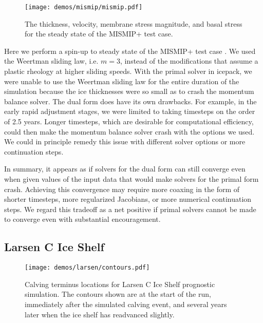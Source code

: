 \documentclass{article}
\theoremstyle{definition}
\theoremstyle{plain}
\begin{document}
\begin{figure}[t]
    \begin{center}
        \texttt{[image: demos/mismip/mismip.pdf]}
    \end{center}
    \caption{The thickness, velocity, membrane stress magnitude, and basal stress for the steady state of the MISMIP+ test case.}
    \label{fig:mismip}
\end{figure}

Here we perform a spin-up to steady state of the MISMIP+ test case \citep{asay2016experimental}.
We used the Weertman sliding law, i.e. $m = 3$, instead of the modifications that assume a plastic rheology at higher sliding speeds.
With the primal solver in icepack, we were unable to use the Weertman sliding law for the entire duration of the simulation because the ice thicknesses were so small as to crash the momentum balance solver.
The dual form does have its own drawbacks.
For example, in the early rapid adjustment stages, we were limited to taking timesteps on the order of 2.5 years.
Longer timesteps, which are desirable for computational efficiency, could then make the momentum balance solver crash with the options we used.
We could in principle remedy this issue with different solver options or more continuation steps.

In summary, it appears as if solvers for the dual form can still converge even when given values of the input data that would make solvers for the primal form crash.
Achieving this convergence may require more coaxing in the form of shorter timesteps, more regularized Jacobians, or more numerical continuation steps.
We regard this tradeoff as a net positive if primal solvers cannot be made to converge even with substantial encouragement.

\subsection{Larsen C Ice Shelf}

\begin{figure}[t]
    \begin{center}
        \texttt{[image: demos/larsen/contours.pdf]}
    \end{center}
    \caption{Calving terminus locations for Larsen C Ice Shelf prognostic simulation.
    The contours shown are at the start of the run, immediately after the simulated calving event, and several years later when the ice shelf has readvanced slightly.}
    \label{fig:larsen-terminus-position}
\end{figure}
\end{document}
